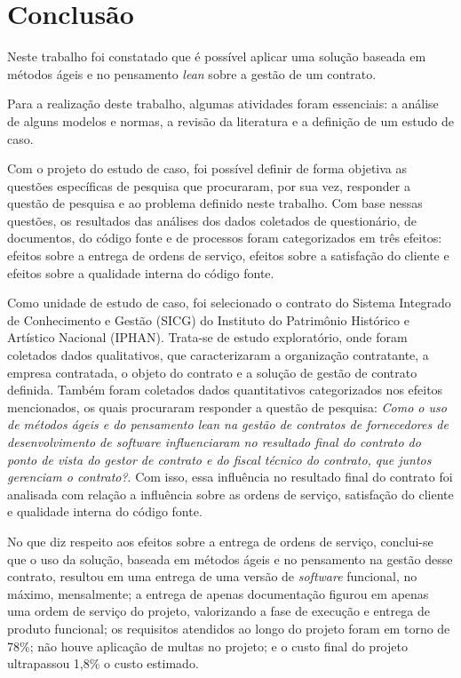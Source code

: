 \chapter[Conclusão]{Conclusão}

Neste trabalho foi constatado que é possível aplicar uma solução baseada em métodos ágeis e no pensamento \textit{lean} sobre a gestão de um contrato.
 
Para a realização deste trabalho, algumas atividades foram essenciais: a análise de alguns modelos e normas, a revisão da literatura e a definição de um estudo de caso.
 
Com o projeto do estudo de caso, foi possível definir de forma objetiva as questões específicas de pesquisa que procuraram, por sua vez, responder a questão de pesquisa e ao problema definido neste trabalho. Com base nessas questões, os resultados das análises dos dados coletados de questionário, de documentos, do código fonte e de processos foram categorizados em três efeitos: efeitos sobre a entrega de ordens de serviço, efeitos sobre a satisfação do cliente e efeitos sobre a qualidade interna do código fonte.
 
Como unidade de estudo de caso, foi selecionado o contrato do Sistema Integrado de Conhecimento e Gestão (SICG) do Instituto do Patrimônio Histórico e Artístico Nacional (IPHAN). Trata-se de estudo exploratório, onde foram coletados dados qualitativos, que caracterizaram a organização contratante, a empresa contratada, o objeto do contrato e a solução de gestão de contrato definida. Também foram coletados dados quantitativos categorizados nos efeitos mencionados, os quais procuraram responder a questão de pesquisa: \textit{ Como o uso de métodos ágeis e do pensamento \textit{lean} na gestão de contratos de fornecedores de desenvolvimento de \textit{software} influenciaram no resultado final do contrato do ponto de vista do gestor de contrato e do fiscal técnico do contrato, que juntos gerenciam o contrato?}. Com isso, essa influência no resultado final do contrato foi analisada com relação a influência sobre as ordens de serviço, satisfação do cliente e qualidade interna do código fonte.

No que diz respeito aos efeitos sobre a entrega de ordens de serviço, conclui-se que o uso da solução, baseada em métodos ágeis e no pensamento na gestão desse contrato, resultou em uma entrega de uma versão de \textit{software} funcional, no máximo, mensalmente; a entrega de apenas documentação figurou em apenas uma ordem de serviço do projeto, valorizando a fase de execução e entrega de produto funcional; os requisitos atendidos ao longo do projeto foram em torno de 78\%; não houve aplicação de multas no projeto; e o custo final do projeto ultrapassou 1,8\% o custo estimado.
 

